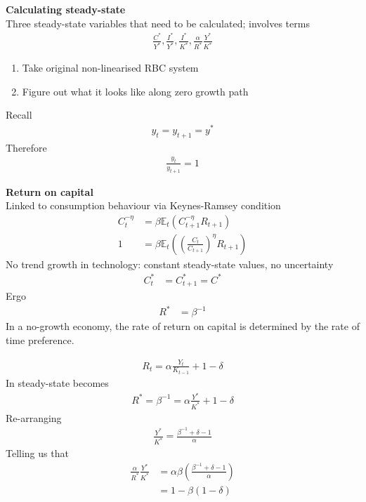 \documentclass{beamer}
\begin{document}
\begin{frame}
  \textbf{Calculating steady-state}\\
  Three steady-state variables that need to be calculated; involves terms
  \begin{align}
    \frac{C^*}{Y^*},\frac{I^*}{Y^*},\frac{I^*}{K^*},\frac{\alpha}{R^*}\frac{Y^*}{K^*}
  \end{align}
  \medskip
  \begin{enumerate}
    \item Take original non-linearised RBC system
    \item Figure out what it looks like along zero growth path
  \end{enumerate}
  \medskip
  Recall  
  \begin{align}
    y_t=y_{t+1}=y^*
  \end{align}
  Therefore
  \begin{align}
    \frac{y_t}{y_{t+1}}=1
  \end{align}
\end{frame}

\begin{frame}
 \textbf{Return on capital}\\
 Linked to consumption behaviour via Keynes-Ramsey condition
 \begin{align}
  C_t^{-\eta} &= \beta \mathbb{E}_t(C_{t+1}^{-\eta}R_{t+1})\\
  1 &= \beta \mathbb{E}_t \left( \left(\frac{C_t}{C_{t+1}} \right)^\eta R_{t+1} \right)
\end{align}
  No trend growth in technology: constant steady-state values, no uncertainty  
  \begin{align}
  C^*_t &= C^*_{t+1}=C^*  
\end{align}
Ergo
\begin{align}
  R^* &= \beta^{-1}
\end{align}
\medskip
In a no-growth economy, the rate of return on capital is determined by the rate of time preference.
\end{frame}

\begin{frame}
\begin{align}
  R_t=\alpha \frac{Y_t}{K_{t-1}}+1-\delta
\end{align}
In steady-state becomes
\begin{align}
  R^*= \beta^{-1} = \alpha \frac{Y^*}{K^*}+1-\delta
\end{align}
Re-arranging
\begin{align}
  \frac{Y^*}{K^*}=\frac{\beta^{-1}+\delta-1}{\alpha}
\end{align}
Telling us that
\begin{align}
  \frac{\alpha}{R^*}\frac{Y^*}{K^*} &=\alpha \beta \left(\frac{\beta^{-1}+\delta-1}{\alpha} \right)\\
  &= 1-\beta(1-\delta)
\end{align}
\end{frame}
\end{document}
